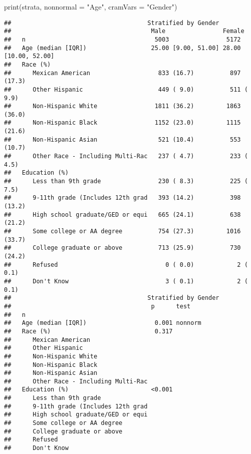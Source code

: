 \documentclass[
]{book}
\newenvironment{Shaded}{\begin{snugshade}}{\end{snugshade}}
\newcommand{\AttributeTok}[1]{\textcolor[rgb]{0.77,0.63,0.00}{#1}}
\newcommand{\FunctionTok}[1]{\textcolor[rgb]{0.00,0.00,0.00}{#1}}
\newcommand{\NormalTok}[1]{#1}
\newcommand{\StringTok}[1]{\textcolor[rgb]{0.31,0.60,0.02}{#1}}
\begin{document}
\begin{Shaded}
\begin{Highlighting}[]
\FunctionTok{print}\NormalTok{(strata, }
      \AttributeTok{nonnormal =} \StringTok{"Age"}\NormalTok{, }
      \AttributeTok{cramVars =} \StringTok{"Gender"}\NormalTok{)}
\end{Highlighting}
\end{Shaded}

\begin{verbatim}
##                                      Stratified by Gender
##                                       Male                Female              
##   n                                    5003                5172               
##   Age (median [IQR])                  25.00 [9.00, 51.00] 28.00 [10.00, 52.00]
##   Race (%)                                                                    
##      Mexican American                   833 (16.7)          897 (17.3)        
##      Other Hispanic                     449 ( 9.0)          511 ( 9.9)        
##      Non-Hispanic White                1811 (36.2)         1863 (36.0)        
##      Non-Hispanic Black                1152 (23.0)         1115 (21.6)        
##      Non-Hispanic Asian                 521 (10.4)          553 (10.7)        
##      Other Race - Including Multi-Rac   237 ( 4.7)          233 ( 4.5)        
##   Education (%)                                                               
##      Less than 9th grade                230 ( 8.3)          225 ( 7.5)        
##      9-11th grade (Includes 12th grad   393 (14.2)          398 (13.2)        
##      High school graduate/GED or equi   665 (24.1)          638 (21.2)        
##      Some college or AA degree          754 (27.3)         1016 (33.7)        
##      College graduate or above          713 (25.9)          730 (24.2)        
##      Refused                              0 ( 0.0)            2 ( 0.1)        
##      Don't Know                           3 ( 0.1)            2 ( 0.1)        
##                                      Stratified by Gender
##                                       p      test   
##   n                                                 
##   Age (median [IQR])                   0.001 nonnorm
##   Race (%)                             0.317        
##      Mexican American                               
##      Other Hispanic                                 
##      Non-Hispanic White                             
##      Non-Hispanic Black                             
##      Non-Hispanic Asian                             
##      Other Race - Including Multi-Rac               
##   Education (%)                       <0.001        
##      Less than 9th grade                            
##      9-11th grade (Includes 12th grad               
##      High school graduate/GED or equi               
##      Some college or AA degree                      
##      College graduate or above                      
##      Refused                                        
##      Don't Know
\end{verbatim}
\end{document}
